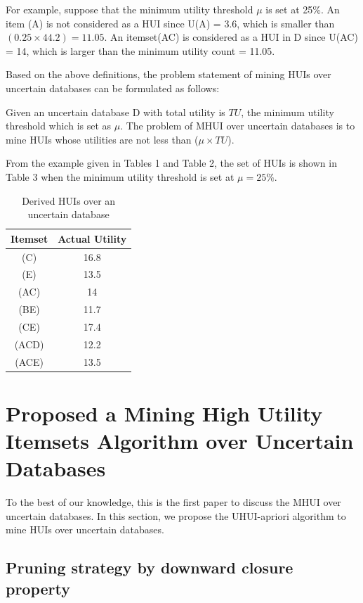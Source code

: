 \documentclass[conference]{IEEEtran}
\begin{document}
For example, suppose that the minimum utility threshold $\mu$ is set at 25\%. An item (A) is not considered as a HUI since U(A) = 3.6, which is smaller than $(0.25 \times 44.2) = 11.05$. An itemset(AC) is considered as a HUI in D since U(AC) = 14, which is larger than the minimum utility count = 11.05.

Based on the above definitions, the problem statement of mining HUIs over uncertain databases can be formulated as follows:

Given an uncertain database D with total utility is $TU$, the minimum utility threshold which is set as $\mu$. The problem of MHUI over uncertain databases is to mine HUIs whose utilities are not less than ($\mu \times TU$).

From the example given in Tables 1 and Table 2, the set of HUIs is shown in Table 3 when the minimum utility threshold is set at $\mu = 25\%$.

\begin{table}
  \centering
  \caption{Derived HUIs over an uncertain database}
  \label{tab:HUIs}
  \begin{tabular}{|c|c|}\hline
  \bfseries Itemset & \bfseries Actual Utility \\ \hline
  (C) & 16.8 \\ \hline
  (E) & 13.5 \\ \hline
  (AC) & 14 \\ \hline
  (BE) & 11.7 \\ \hline
  (CE) & 17.4 \\ \hline
  (ACD) & 12.2 \\ \hline
  (ACE) & 13.5 \\ \hline
  \end{tabular}
\end{table}

\section{Proposed a Mining High Utility Itemsets Algorithm over Uncertain Databases}

To the best of our knowledge, this is the first paper to discuss the MHUI over uncertain databases. In this section, we propose the UHUI-apriori algorithm to mine HUIs over uncertain databases.

\vspace{-0.1cm}
\subsection{Pruning strategy by downward closure property}
\end{document}
